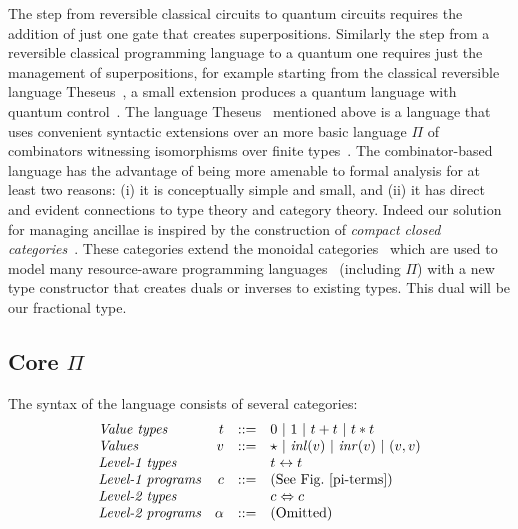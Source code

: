 \documentclass[sigplan,10pt,review,anonymous]{acmart}
\newcommand{\alt}{~|~}
\newcommand{\inlv}[1]{\ensuremath{\mathit{inl}(v)}}
\newcommand{\inrv}[1]{\ensuremath{\mathit{inr}(v)}}
\begin{document}
The step from reversible classical circuits to quantum circuits
requires the addition of just one gate that creates
superpositions. Similarly the step from a reversible classical
programming language to a quantum one requires just the management of
superpositions, for example starting from the classical reversible
language Theseus~\cite{james2014theseus}, a small extension produces a quantum
language with quantum control~\cite{10.1007/978-3-319-89366-2_19}. The
language Theseus~\cite{james2014theseus} mentioned above is a language that uses
convenient syntactic extensions over an more basic language $\Pi$ of
combinators witnessing isomorphisms over finite types~\cite{XXX}. The
combinator-based language has the advantage of being more amenable to
formal analysis for at least two reasons: (i) it is conceptually
simple and small, and (ii) it has direct and evident connections to
type theory and category theory. Indeed our solution for managing
ancillae is inspired by the construction of \emph{compact closed
  categories}~\cite{XXX}. These categories extend the monoidal
categories~\cite{XXX} which are used to model many resource-aware
programming languages~\cite{XXX} (including $\Pi$) with a new type
constructor that creates duals or inverses to existing types. This
dual will be our fractional type.

\subsection{Core $\Pi$}
\label{sub:core}

The syntax of the language consists of several categories:
\[\begin{array}{lrcl}
\textit{Value types} & t &::=& 0 \alt 1 \alt t+t \alt t*t \\
\textit{Values}      & v &::=& \star \alt \inlv{v} \alt \inrv{v} \alt (v,v) \\
\textit{Level-1 types} &&& t \leftrightarrow t \\
\textit{Level-1 programs} & c &::=& (\textrm{See Fig.~\ref{pi-terms}})\\
\textit{Level-2 types} &&& c \Leftrightarrow c \\
\textit{Level-2 programs} & \alpha &::=& (\textrm{Omitted})
\end{array}\]
\end{document}
